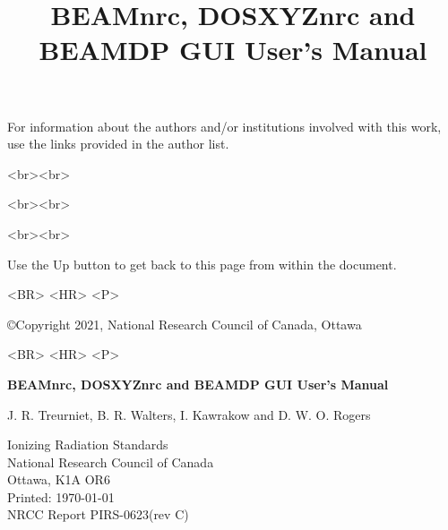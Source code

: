 \documentclass[12pt,twoside]{article}
\begin{document}
\begin{htmlonly}
For information about the authors and/or institutions involved with this
work, use the links provided in the author list.\\
\begin{rawhtml}
<br><br>
\end{rawhtml}
\begin{rawhtml}
<br><br>
\end{rawhtml}
\begin{rawhtml}
<br><br>
\end{rawhtml}

Use the Up button to get back to this page from within the document.
\begin{rawhtml}
<BR> <HR> <P>
\end{rawhtml}
\copyright Copyright 2021, National Research Council of Canada, Ottawa
\begin{rawhtml}
<BR> <HR> <P>
\end{rawhtml}
\end{htmlonly}

\pagestyle{empty}

\title{BEAMnrc, DOSXYZnrc and BEAMDP GUI User's Manual}
\begin{center}
{\sffamily \bfseries \Huge BEAMnrc, DOSXYZnrc and BEAMDP GUI User's Manual \vspace{5mm}\\}
\begin{large}
J. R. Treurniet, B. R. Walters, I. Kawrakow and D. W. O. Rogers\\
\end{large}
Ionizing Radiation Standards\\
National Research Council of Canada\\Ottawa, K1A OR6\\

Printed: \today  \\
\hfill NRCC Report {\sf PIRS-0623(rev C)}\\

\end{center}

\vskip 0.8in
\end{document}
